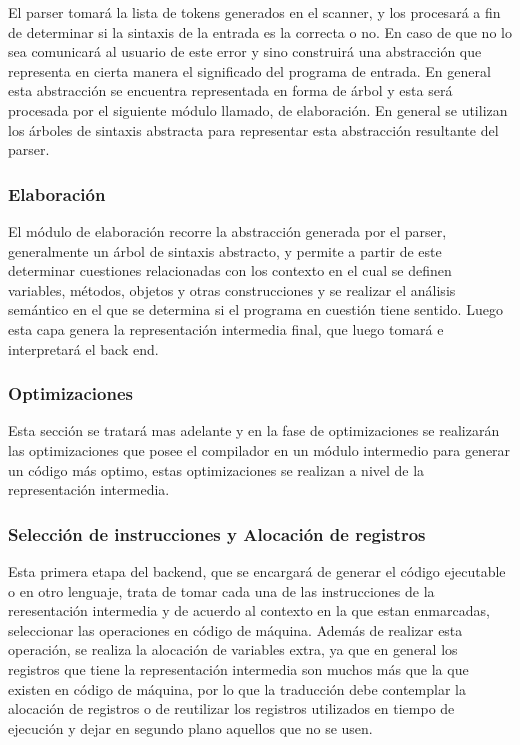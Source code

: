 \documentclass[fleqn]{tcdl}
\begin{document}
El parser tomará la lista de tokens generados en el scanner, y los procesará a fin de determinar si la sintaxis de la entrada es la correcta o no. En caso de que no lo sea comunicará al usuario de este error y sino construirá una abstracción que representa en cierta manera el significado del programa de entrada. En general esta abstracción se encuentra representada en forma de árbol y esta será procesada por el siguiente módulo llamado, de elaboración. En general se utilizan los árboles de sintaxis abstracta para representar esta abstracción resultante del parser.


\subsubsection*{Elaboración}

El módulo de elaboración recorre la abstracción generada por el parser, generalmente un árbol de sintaxis abstracto, y permite a partir de este determinar cuestiones relacionadas con los contexto en el cual se definen variables, métodos, objetos y otras construcciones y se realizar el análisis semántico en el que se determina si el programa en cuestión tiene sentido. Luego esta capa genera la representación intermedia final, que luego tomará e interpretará el back end.


\subsubsection*{Optimizaciones}

Esta sección se tratará mas adelante y en la fase de optimizaciones se realizarán las optimizaciones que posee el compilador en un módulo intermedio para generar un código más optimo, estas optimizaciones se realizan a nivel de la representación intermedia.

\subsubsection*{Selección de instrucciones y Alocación de registros}

Esta primera etapa del backend, que se encargará de generar el código ejecutable o en otro lenguaje, trata de tomar cada una de las instrucciones de la reresentación intermedia y de acuerdo al contexto en la que estan enmarcadas, seleccionar las operaciones en código de máquina. Además de realizar esta operación, se realiza la alocación de variables extra, ya que en general los registros que tiene la representación intermedia son muchos más que la que existen en código de máquina, por lo que la traducción debe contemplar la alocación de registros o de reutilizar los registros utilizados en tiempo de ejecución y dejar en segundo plano aquellos que no se usen.
\end{document}
